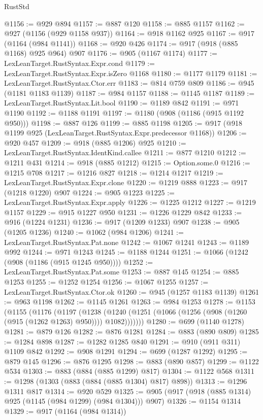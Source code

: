 \begin{lexlean}{RustStd}
\begin{coremodule}
@1156 := @929 @894
@1157 := @887 @120
@1158 := @885 @1157
@1162 := @927 (@1156 (@929 @1158 @937))
@1164 := @918 @1162 @925
@1167 := @917 (@1164 (@984 @1141))
@1168 := @920 @426
@1174 := @917 (@918 (@885 @1168) @925 @964) @907
@1176 := @905 (@1167 @1174)
@1177 := LexLeanTarget.RustSyntax.Expr.cond
@1179 := LexLeanTarget.RustSyntax.Expr.isZero @1168
@1180 := @1177 @1179
@1181 := LexLeanTarget.RustSyntax.Ctor.err
@1183 := @814 @759 @809
@1186 := @945 (@1181 @1183 @1139)
@1187 := @984 @1157
@1188 := @1145 @1187
@1189 := LexLeanTarget.RustSyntax.Lit.bool
@1190 := @1189 @842
@1191 := @971 @1190
@1192 := @1188 @1191
@1197 := @1180 (@908 (@1186 (@915 @1192 @950)))
@1198 := @887 @126
@1199 := @885 @1198
@1205 := @917 (@918 @1199 @925 (LexLeanTarget.RustSyntax.Expr.predecessor @1168))
@1206 := @920 @457
@1209 := @918 (@885 @1206) @925
@1210 := LexLeanTarget.RustSyntax.IdentKind.callee
@1211 := @877 @1210
@1212 := @1211 @431
@1214 := @918 (@885 @1212)
@1215 := Option.some.{0}
@1216 := @1215 @708
@1217 := @1216 @827
@1218 := @1214 @1217
@1219 := LexLeanTarget.RustSyntax.Expr.clone
@1220 := @1219 @888
@1223 := @917 (@1218 @1220) @907
@1224 := @905 @1223
@1225 := LexLeanTarget.RustSyntax.Expr.apply
@1226 := @1225 @1212
@1227 := @1219 @1157
@1229 := @915 @1227 @950
@1231 := @1226 @1229 @842
@1233 := @916 (@1224 @1231)
@1236 := @917 (@1209 @1233) @907
@1238 := @905 (@1205 @1236)
@1240 := @1062 (@984 @1206)
@1241 := LexLeanTarget.RustSyntax.Pat.none
@1242 := @1067 @1241
@1243 := @1189 @992
@1244 := @971 @1243
@1245 := @1188 @1244
@1251 := @1066 (@1242 (@908 (@1186 (@915 @1245 @950))))
@1252 := LexLeanTarget.RustSyntax.Pat.some
@1253 := @887 @145
@1254 := @885 @1253
@1255 := @1252 @1254
@1256 := @1067 @1255
@1257 := LexLeanTarget.RustSyntax.Ctor.ok
@1260 := @945 (@1257 @1183 @1139)
@1261 := @963 @1198
@1262 := @1145 @1261
@1263 := @984 @1253
@1278 := @1153
    (@1155
      (@1176
        (@1197
          (@1238 (@1240 (@1251 (@1066 (@1256 (@908 (@1260 (@915 (@1262 @1263) @950)))) @1082)))))))
@1280 := @699 (@1140 @1278)
@1281 := @879 @126
@1282 := @876 @1281
@1284 := @883 (@890 @809)
@1285 := @1284 @898
@1287 := @1282 @1285 @840
@1291 := @910 (@911 @311) @1109 @842
@1292 := @908 @1291
@1294 := @699 (@1287 @1292)
@1295 := @879 @145
@1296 := @876 @1295
@1298 := @883 (@890 @857)
@1299 := @1122 @534
@1303 := @883 (@884 (@885 @1299) @817)
@1304 := @1122 @568
@1311 := @1298 (@1303 (@883 (@884 (@885 @1304) @817) @898))
@1313 := @1296 @1311 @817
@1314 := @920 @529
@1325 := @905 (@917 (@918 (@885 @1314) @925 (@1145 (@984 @1299) (@984 @1304))) @907)
@1326 := @1154 @1314
@1329 := @917 (@1164 (@984 @1314))

\end{coremodule}
\end{lexlean}
